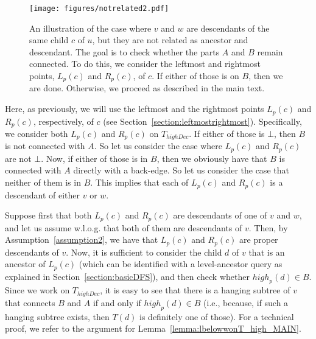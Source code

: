 \documentclass[11pt,a4paper]{article}
\begin{document}
\begin{figure}[h!]\centering
\texttt{[image: figures/notrelated2.pdf]}
\caption{\small{An illustration of the case where $v$ and $w$ are descendants of the same child $c$ of $u$, but they are not related as ancestor and descendant. The goal is to check whether the parts $A$ and $B$ remain connected. To do this, we consider the leftmost and rightmost points, $L_p(c)$ and $R_p(c)$, of $c$. If either of those is on $B$, then we are done. Otherwise, we proceed as described in the main text.}}\label{figure:notrelated2}
\end{figure}

Here, as previously, we will use the leftmost and the rightmost points $L_p(c)$ and $R_p(c)$, respectively, of $c$ (see Section~\ref{section:leftmostrightmost}). Specifically, we consider both $L_p(c)$ and $R_p(c)$ on $T_\mathit{highDec}$. If either of those is $\bot$, then $B$ is not connected with $A$. So let us consider the case where $L_p(c)$ and $R_p(c)$ are not $\bot$. Now, if either of those is in $B$, then we obviously have that $B$ is connected with $A$ directly with a back-edge. So let us consider the case that neither of them is in $B$. This implies that each of $L_p(c)$ and $R_p(c)$ is a descendant of either $v$ or $w$. 

Suppose first that both $L_p(c)$ and $R_p(c)$ are descendants of one of $v$ and $w$, and let us assume w.l.o.g. that both of them are descendants of $v$. Then, by Assumption~\ref{assumption2}, we have that $L_p(c)$ and $R_p(c)$ are proper descendants of $v$. Now, it is sufficient to consider the child $d$ of $v$ that is an ancestor of $L_p(c)$ (which can be identified with a level-ancestor query as explained in Section~\ref{section:basicDFS}), and then check whether $\mathit{high}_p(d)\in B$. Since we work on $T_\mathit{highDec}$, it is easy to see that there is a hanging subtree of $v$ that connects $B$ and $A$ if and only if $\mathit{high}_p(d)\in B$ (i.e., because, if such a hanging subtree exists, then $T(d)$ is definitely one of those). For a technical proof, we refer to the argument for Lemma~\ref{lemma:lbelowwonT_high_MAIN}.
 
\end{document}
